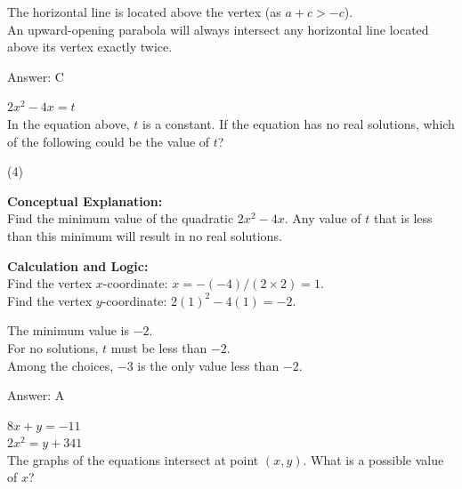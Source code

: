 \documentclass[11pt,paper=a4,answers]{exam}
\begin{document}
\begin{questions}
\begin{solution}
\vspace{10pt}

The horizontal line is located above the vertex (as $a+c > -c$). \\
An upward-opening parabola will always intersect any horizontal line located above its vertex exactly twice.

\vspace{25pt}

Answer: \colorbox{yellow!100}{C}
\end{solution}

\vspace{40pt}

\question
$2x^2 - 4x = t$ \\
In the equation above, $t$ is a constant. If the equation has no real solutions, which of the following could be the value of $t$?
\begin{tasks}(4)
\end{tasks}

\begin{solution}
\textbf{Conceptual Explanation:} \\
Find the minimum value of the quadratic $2x^2 - 4x$. Any value of $t$ that is less than this minimum will result in no real solutions.

\vspace{20pt}

\textbf{Calculation and Logic:} \\
Find the vertex $x$-coordinate: $x = -(-4) / (2 \times 2) = 1$. \\
Find the vertex $y$-coordinate: $2(1)^2 - 4(1) = -2$.

\vspace{10pt}

The minimum value is $-2$. \\
For no solutions, $t$ must be less than $-2$. \\
Among the choices, $-3$ is the only value less than $-2$.

\vspace{25pt}

Answer: \colorbox{yellow!100}{A}
\end{solution}

\vspace{40pt}

\question
$8x + y = -11$ \\
$2x^2 = y + 341$ \\
The graphs of the equations intersect at point $(x, y)$. What is a possible value of $x$?


\end{questions}
\end{document}
